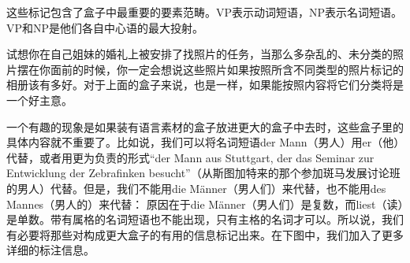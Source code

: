 这些标记包含了盒子中最重要的要素范畴。VP表示动词短语，NP表示名词短语。VP和NP是他们各自中心语的最大投射。

试想你在自己姐妹的婚礼上被安排了找照片的任务，当那么多杂乱的、未分类的照片摆在你面前的时候，你一定会想说这些照片如果按照所含不同类型的照片标记的相册该有多好。对于上面的盒子来说，也是一样，如果能按照内容将它们分类将是一个好主意。

一个有趣的现象是如果装有语言素材的盒子放进更大的盒子中去时，这些盒子里的具体内容就不重要了。比如说，我们可以将名词短语der Mann（男人）用er（他）代替，或者用更为负责的形式“der Mann aus Stuttgart, der das Seminar zur Entwicklung der Zebrafinken besucht”（从斯图加特来的那个参加斑马发展讨论班的男人）代替。但是，我们不能用die Männer（男人们）来代替，也不能用des Mannes（男人的）来代替：
\eal 
{} 
\zl 
原因在于die Männer（男人们）是复数，而liest（读）是单数。带有属格的名词短语也不能出现，只有主格的名词才可以。所以说，我们有必要将那些对构成更大盒子的有用的信息标记出来。在下图中，我们加入了更多详细的标注信息。

